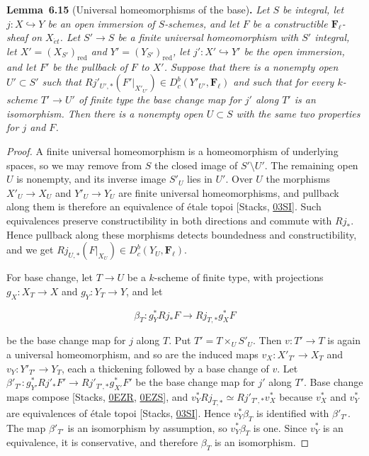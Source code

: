 \documentclass[11pt]{article}
\newenvironment{bpstatement}[2]{\par\addvspace{0.6\baselineskip}\noindent\textbf{#1}#2\textbf{.}\enspace\ignorespaces}
  {\par\addvspace{0.4\baselineskip}}
\newenvironment{bpstatementit}[2]{\begin{bpstatement}{#1}{#2}\itshape\ignorespaces}{\end{bpstatement}}
\providecommand{\Dbc}{}\renewcommand{\Dbc}{D^b_c}
\providecommand{\Fell}{}\renewcommand{\Fell}{\mathbf F_\ell}
\begin{document}
\label{bp47}%
\begin{bpstatementit}{Lemma~6.15}{ (Universal homeomorphisms of the base)}
Let \(S\) be integral, let \(j:X\hookrightarrow Y\) be an open immersion of \(S\)-schemes, and let \(F\) be a constructible \(\Fell\)-sheaf on \(X_{\acute{e}t}\). Let \(S'\to S\) be a finite universal homeomorphism with \(S'\) integral, let \(X'=(X_{S'})_{\mathrm{red}}\) and \(Y'=(Y_{S'})_{\mathrm{red}}\), let \(j':X'\hookrightarrow Y'\) be the open immersion, and let \(F'\) be the pullback of \(F\) to \(X'\). Suppose that there is a nonempty open \(U'\subset S'\) such that \(Rj'_{U',*}(F'|_{X'_{U'}})\in\Dbc(Y'_{U'},\Fell)\) and such that for every \(k\)-scheme \(T'\to U'\) of finite type the base change map for \(j'\) along \(T'\) is an isomorphism. Then there is a nonempty open \(U\subset S\) with the same two properties for \(j\) and \(F\).
\end{bpstatementit}

\begin{proof}[{Proof}]\label{bp48}%
A finite universal homeomorphism is a homeomorphism of underlying spaces, so we may remove from \(S\) the closed image of \(S'\setminus U'\). The remaining open \(U\) is nonempty, and its inverse image \(S'_U\) lies in \(U'\). Over \(U\) the morphisms \(X'_U\to X_U\) and \(Y'_U\to Y_U\) are finite universal homeomorphisms, and pullback along them is therefore an equivalence of étale topoi [Stacks, \href{https://stacks.math.columbia.edu/tag/03SI}{03SI}]. Such equivalences preserve constructibility in both directions and commute with \(Rj_*\). Hence pullback along these morphisms detects boundedness and constructibility, and we get \(Rj_{U,*}(F|_{X_U})\in\Dbc(Y_U,\Fell)\).

For base change, let \(T\to U\) be a \(k\)-scheme of finite type, with projections \(g_X:X_T\to X\) and \(g_Y:Y_T\to Y\), and let

\[
\beta_T:g_Y^*Rj_*F\longrightarrow Rj_{T,*}g_X^*F
\]

be the base change map for \(j\) along \(T\). Put \(T'=T\times_US'_U\). Then \(v:T'\to T\) is again a universal homeomorphism, and so are the induced maps \(v_X:X'_{T'}\to X_T\) and \(v_Y:Y'_{T'}\to Y_T\), each a thickening followed by a base change of \(v\). Let \(\beta'_{T'}:g_{Y'}^*Rj'_*F'\to Rj'_{T',*}g_{X'}^*F'\) be the base change map for \(j'\) along \(T'\). Base change maps compose [Stacks, \href{https://stacks.math.columbia.edu/tag/0EZR}{0EZR}, \href{https://stacks.math.columbia.edu/tag/0EZS}{0EZS}], and \(v_Y^*Rj_{T,*}\simeq Rj'_{T',*}v_X^*\) because \(v_X^*\) and \(v_Y^*\) are equivalences of étale topoi [Stacks, \href{https://stacks.math.columbia.edu/tag/03SI}{03SI}]. Hence \(v_Y^*\beta_T\) is identified with \(\beta'_{T'}\). The map \(\beta'_{T'}\) is an isomorphism by assumption, so \(v_Y^*\beta_T\) is one. Since \(v_Y^*\) is an equivalence, it is conservative, and therefore \(\beta_T\) is an isomorphism.
\end{proof}
\end{document}
